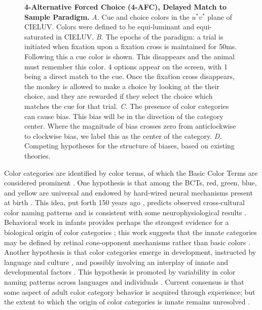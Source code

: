 \begin{figure}
    
    \caption{\textbf{4-Alternative Forced Choice (4-AFC), Delayed Match to Sample Paradigm.}
    \emph{A.} Cue and choice colors in the $u^*v^*$ plane of CIELUV. Colors were defined to be equi-luminant and equi-saturated in CIELUV.
    \emph{B.} The epochs of the paradigm: a trial is initiated when fixation upon a fixation cross is maintained for 50ms. Following this a cue color is shown. This disappears and the animal must remember this color. 4 options appear on the screen, with 1 being a direct match to the cue. Once the fixation cross disappears, the monkey is allowed to make a choice by looking at the their choice, and they are rewarded if they select the choice which matches the cue for that trial.
    \emph{C.} The presence of color categories can cause bias. This bias will be in the direction of the category center.
    Where the magnitude of bias crosses zero from anticlockwise to clockwise bias, we label this as the center of the category.
    \emph{D.} Competing hypotheses for the structure of biases, based on existing theories.
} 
    \label{fig:ParadigmAnalysisPredictions}
    
\end{figure}

Color categories are identified by color terms, of which the Basic Color Terms are considered prominent \citep{berlin_basic_1969}.
One hypothesis is that among the BCTs, red, green, blue, and yellow are universal \citep{heider_universals_1972,regier_focal_2005}
and endowed by hard-wired neural mechanisms present at birth \citep{bornstein_categories_1976,lindsey_universality_2006}. 
This idea, put forth 150 years ago \citep{hering_zur_1875}, predicts observed cross-cultural color naming patterns \citep{jameson_evolutionary_2009,baronchelli_modeling_2010,lindsey_hunter-gatherer_2015,abbott_focal_2016}
and is consistent with some neurophysiological results \citep{clifford_electrophysiological_2009,holmes_neurophysiological_2009,brouwer_categorical_2013,bird_categorical_2014,yang_cortical_2016,forder_colour_2017}
. 
Behavioral work in infants provides perhaps the strongest evidence for a biological origin of color categories \citep{franklin_new_2004,ozturk_language_2013}; this work suggests that the innate categories may be defined by retinal cone-opponent mechanisms rather than basic colors \citep{skelton_biological_2017,maule_color_2019}.
Another hypothesis is that color categories emerge in development, instructed by language and culture \citep{roberson_color_2005, regier_language_2009, cibelli_sapir-whorf_2016}, and possibly involving an interplay of innate and developmental factors \citep{kay_language_2006,franklin_lateralization_2008,regier_language_2009}. 
This hypothesis is promoted by variability in color naming patterns across languages and individuals \citep{davidoff_colour_1999,roberson_color_2000,paramei_online_2018,webster_variations_2002}.
Current consensus is that some aspect of adult color category behavior is acquired through experience; but the extent to which the origin of color categories is innate remains unresolved \citep{davidoff_nature_2009,skelton_colour_2023}.

